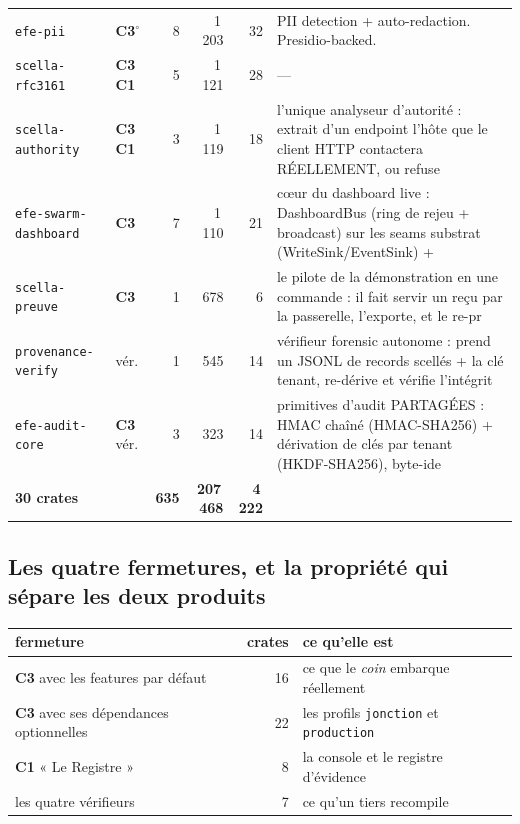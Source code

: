 \documentclass[10pt]{report}
\newcommand{\code}[1]{\texttt{\small #1}}
\newcommand{\ctrois}{\textcolor{c3col}{\textbf{C3}}}
\newcommand{\cun}{\textcolor{c1col}{\textbf{C1}}}
\begin{document}
\begin{longtable}{@{}p{4.3cm}p{1.6cm}r r r p{5.7cm}@{}}
\code{efe-pii} & \ctrois{}$^{\circ}$ & 8 & 1\,203 & 32 & \footnotesize PII detection + auto-redaction. Presidio-backed. \\
\code{scella-rfc3161} & \ctrois{} \cun{} & 5 & 1\,121 & 28 & \footnotesize --- \\
\code{scella-authority} & \ctrois{} \cun{} & 3 & 1\,119 & 18 & \footnotesize l'unique analyseur d'autorité : extrait d'un endpoint l'hôte que le client HTTP contactera RÉELLEMENT, ou refuse \\
\code{efe-swarm-dashboard} & \ctrois{} & 7 & 1\,110 & 21 & \footnotesize cœur du dashboard live : DashboardBus (ring de rejeu + broadcast) sur les seams substrat (WriteSink/EventSink) + \\
\code{scella-preuve} & \ctrois{} & 1 & 678 & 6 & \footnotesize le pilote de la démonstration en une commande : il fait servir un reçu par la passerelle, l'exporte, et le re-pr \\
\code{provenance-verify} & vér. & 1 & 545 & 14 & \footnotesize vérifieur forensic autonome : prend un JSONL de records scellés + la clé tenant, re-dérive et vérifie l'intégrit \\
\code{efe-audit-core} & \ctrois{} vér. & 3 & 323 & 14 & \footnotesize primitives d'audit PARTAGÉES : HMAC chaîné (HMAC-SHA256) + dérivation de clés par tenant (HKDF-SHA256), byte-ide \\
\midrule \textbf{30 crates} & & \textbf{635} & \textbf{207\,468} & \textbf{4\,222} & \\ \bottomrule
\end{longtable}


\subsection{Les quatre fermetures, et la propriété qui sépare les deux produits}

\begin{longtable}{@{}p{7.2cm}r p{6.6cm}@{}}
\toprule \textbf{fermeture} & \textbf{crates} & \textbf{ce qu'elle est} \\ \midrule \endhead
\ctrois{} avec les features par défaut & 16 & ce que le \emph{coin} embarque réellement \\
\ctrois{} avec ses dépendances optionnelles & 22 & les profils \code{jonction} et \code{production} \\
\cun{} « Le Registre » & 8 & la console et le registre d'évidence \\
les quatre vérifieurs & 7 & ce qu'un tiers recompile \\
\bottomrule
\end{longtable}
\end{document}
